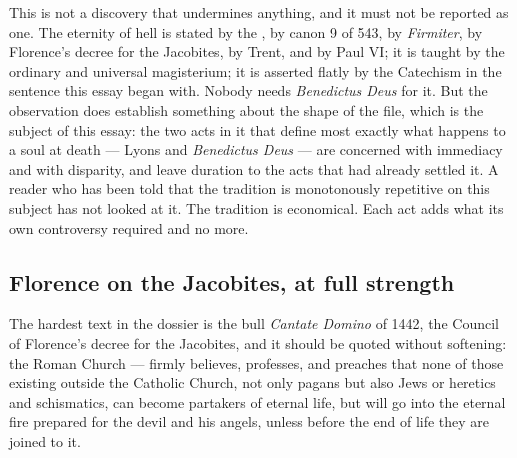 This is not a discovery that undermines anything, and it must not be reported as one. The eternity of hell is stated by the , by canon 9 of 543, by \emph{Firmiter}, by Florence's decree for the Jacobites, by Trent, and by Paul VI; it is taught by the ordinary and universal magisterium; it is asserted flatly by the Catechism in the sentence this essay began with. Nobody needs \emph{Benedictus Deus} for it. But the observation does establish something about the shape of the file, which is the subject of this essay: the two acts in it that define most exactly what happens to a soul at death --- Lyons and \emph{Benedictus Deus} --- are concerned with immediacy and with disparity, and leave duration to the acts that had already settled it. A reader who has been told that the tradition is monotonously repetitive on this subject has not looked at it. The tradition is economical. Each act adds what its own controversy required and no more.

\subsection{Florence on the Jacobites, at full strength}

The hardest text in the dossier is the bull \emph{Cantate Domino} of 1442, the Council of Florence's decree for the Jacobites, and it should be quoted without softening: the Roman Church  --- firmly believes, professes, and preaches that none of those existing outside the Catholic Church, not only pagans but also Jews or heretics and schismatics, can become partakers of eternal life, but will go into the eternal fire prepared for the devil and his angels, unless before the end of life they are joined to it.

